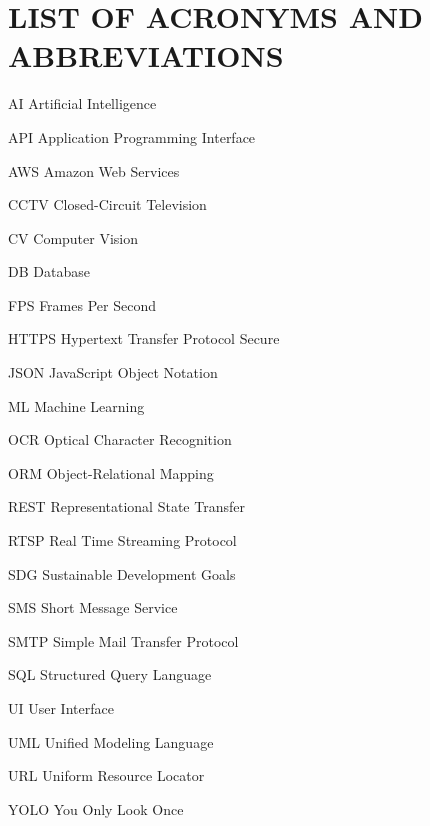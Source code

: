 \documentclass[10pt,openany]{report}
\begin{document}
\begin{sloppypar}
{{{\begin{sloppypar}
\textbf{}
\newpage
\renewcommand*\listfigurename{LIST OF FIGURES}
\listoffigures
\newpage
\renewcommand{\listtablename}{LIST OF TABLES}
\listoftables
\newpage
{}
\chapter*{LIST OF ACRONYMS AND ABBREVIATIONS}

\begin{abbrv}
\item[AI] Artificial Intelligence
\item[API] Application Programming Interface
\item[AWS] Amazon Web Services
\item[CCTV] Closed-Circuit Television
\item[CV] Computer Vision
\item[DB] Database
\item[FPS] Frames Per Second
\item[HTTPS] Hypertext Transfer Protocol Secure
\item[JSON] JavaScript Object Notation
\item[ML] Machine Learning
\item[OCR] Optical Character Recognition
\item[ORM] Object-Relational Mapping
\item[REST] Representational State Transfer
\item[RTSP] Real Time Streaming Protocol
\item[SDG] Sustainable Development Goals
\item[SMS] Short Message Service
\item[SMTP] Simple Mail Transfer Protocol
\item[SQL] Structured Query Language
\item[UI] User Interface
\item[UML] Unified Modeling Language
\item[URL] Uniform Resource Locator
\item[YOLO] You Only Look Once
\end{abbrv}
\newpage
\renewcommand*\contentsname{TABLE OF CONTENTS}
\tableofcontents
{}
\thispagestyle{empty}
\newpage

\end{sloppypar}}}}
\end{sloppypar}
\end{document}
